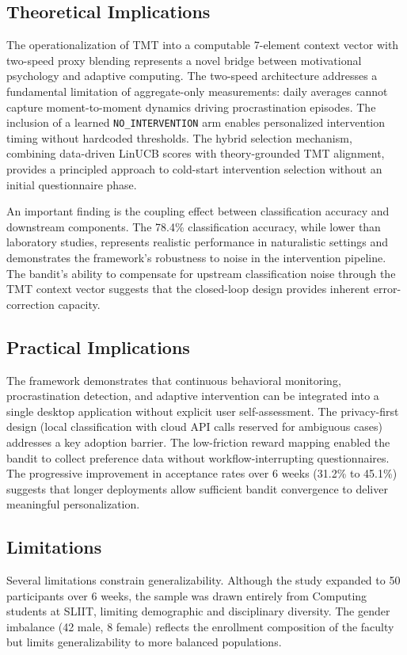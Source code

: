 \documentclass[conference]{IEEEtran}
\begin{document}
\subsection{Theoretical Implications}
The operationalization of TMT into a computable 7-element context vector with two-speed proxy blending represents a novel bridge between motivational psychology and adaptive computing. The two-speed architecture addresses a fundamental limitation of aggregate-only measurements: daily averages cannot capture moment-to-moment dynamics driving procrastination episodes. The inclusion of a learned \texttt{NO\_INTERVENTION} arm enables personalized intervention timing without hardcoded thresholds. The hybrid selection mechanism, combining data-driven LinUCB scores with theory-grounded TMT alignment, provides a principled approach to cold-start intervention selection without an initial questionnaire phase.

An important finding is the coupling effect between classification accuracy and downstream components. The 78.4\% classification accuracy, while lower than laboratory studies, represents realistic performance in naturalistic settings and demonstrates the framework's robustness to noise in the intervention pipeline. The bandit's ability to compensate for upstream classification noise through the TMT context vector suggests that the closed-loop design provides inherent error-correction capacity.

\subsection{Practical Implications}
The framework demonstrates that continuous behavioral monitoring, procrastination detection, and adaptive intervention can be integrated into a single desktop application without explicit user self-assessment. The privacy-first design (local classification with cloud API calls reserved for ambiguous cases) addresses a key adoption barrier. The low-friction reward mapping enabled the bandit to collect preference data without workflow-interrupting questionnaires. The progressive improvement in acceptance rates over 6 weeks (31.2\% to 45.1\%) suggests that longer deployments allow sufficient bandit convergence to deliver meaningful personalization.

\subsection{Limitations}
\label{sec_limitations}
Several limitations constrain generalizability. Although the study expanded to 50 participants over 6 weeks, the sample was drawn entirely from Computing students at SLIIT, limiting demographic and disciplinary diversity. The gender imbalance (42 male, 8 female) reflects the enrollment composition of the faculty but limits generalizability to more balanced populations.
\end{document}
